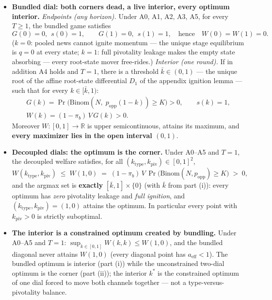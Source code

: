 \begin{proposition}\label{prop:bundle}
\leavevmode
\begin{itemize}
\item[(i)] \textbf{Bundled dial: both corners dead, a live interior, every optimum interior.}
\emph{Endpoints (any horizon).} Under A0, A1, A2, A3, A5, for every $T\ge 1$, the bundled game
satisfies
\[
G(0)=0,\ \ s(0)=1,\qquad G(1)=0,\ \ s(1)=1,\quad\text{hence}\quad W(0)=W(1)=0 .
\]
($k=0$: pooled news cannot ignite momentum --- the unique stage equilibrium is $q=0$ at every
state; $k=1$: full pivotality leakage makes the empty state absorbing --- every root-state mover
free-rides.)
\emph{Interior (one round).} If in addition A4 holds and $T=1$, there is a threshold
$\bar k\in(0,1)$ --- the unique root of the affine root-state differential $D_1$ of the
appendix ignition lemma --- such that for every $k\in[\bar k,1)$:
\begin{gather*}
G(k)=\Pr\!\big(\mathrm{Binom}(N,\;p_{\mathrm{opp}}(1-k))\ge K\big)>0,\qquad s(k)=1,\\
W(k)=(1-\pi_b)\,V\,G(k)>0 .
\end{gather*}
Moreover $W:[0,1]\to\mathbb R$ is upper semicontinuous, attains its maximum, and \textbf{every
maximizer lies in the open interval $(0,1)$}.
\item[(ii)] \textbf{Decoupled dials: the optimum is the corner.} Under A0--A5 and $T=1$, the
decoupled welfare satisfies, for all $(k_{\mathrm{type}},k_{\mathrm{piv}})\in[0,1]^2$,
\[
W(k_{\mathrm{type}},k_{\mathrm{piv}})\;\le\;W(1,0)\;=\;(1-\pi_b)\,V\,
\Pr\!\big(\mathrm{Binom}(N,p_{\mathrm{opp}})\ge K\big)\;>\;0,
\]
and the argmax set is \textbf{exactly} $[\bar k,1]\times\{0\}$ (with $\bar k$ from part (i)):
every optimum has \emph{zero} pivotality leakage and \emph{full ignition}, and
$(k_{\mathrm{type}},k_{\mathrm{piv}})=(1,0)$ attains the optimum. In particular every point
with $k_{\mathrm{piv}}>0$ is strictly suboptimal.
\item[(iii)] \textbf{The interior is a constrained optimum created by bundling.} Under A0--A5
and $T=1$: $\sup_{k\in[0,1]}W(k,k)\le W(1,0)$, and the bundled diagonal never attains $W(1,0)$
(every diagonal point has $a_{\mathrm{eff}}<1$). The bundled optimum is interior (part (i))
while the unconstrained two-dial optimum is the corner (part (ii)); the interior $k^*$ is the
constrained optimum of one dial forced to move both channels together --- not a
type-versus-pivotality balance.
\end{itemize}
\end{proposition}


